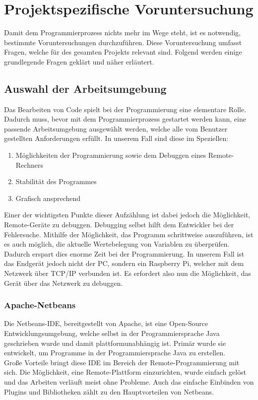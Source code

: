 \section{Projektspezifische Voruntersuchung}\label{sec:projektspezifische-voruntersuchung}
Damit dem Programmierprozess nichts mehr im Wege steht, ist es notwendig, bestimmte Voruntersuchungen durchzuführen.
Diese Voruntersuchung umfasst Fragen, welche für des gesamten Projekts relevant sind.
Folgend werden einige grundlegende Fragen geklärt und näher erläutert.
\subsection{Auswahl der Arbeitsumgebung}\label{subsec:auswahl-der-arbeitsumgebung}
Das Bearbeiten von Code spielt bei der Programmierung eine elementare Rolle.
Dadurch muss, bevor mit dem Programmierprozess gestartet werden kann, eine passende Arbeitsumgebung ausgewählt werden, welche alle vom Benutzer gestellten Anforderungen erfüllt.
In unserem Fall sind diese im Speziellen:
\begin{enumerate}
    \item Möglichkeiten der Programmierung sowie dem Debuggen eines Remote-Rechners
    \item Stabilität des Programmes
    \item Grafisch ansprechend
\end{enumerate}
Einer der wichtigsten Punkte dieser Aufzählung ist dabei jedoch die Möglichkeit, Remote-Geräte zu debuggen.
Debugging selbst hilft dem Entwickler bei der Fehlersuche.
Mithilfe der Möglichkeit, das Programm schrittweise auszuführen, ist es auch möglich, die aktuelle Wertebelegung von Variablen zu überprüfen.
Dadurch erspart dies enorme Zeit bei der Programmierung.
In unserem Fall ist das Endgerät jedoch nicht der PC, sondern ein Raspberry Pi, welcher mit dem Netzwerk über TCP/IP verbunden ist.
Es erfordert also nun die Möglichkeit, das Gerät über das Netzwerk zu debuggen.
\subsubsection{Apache-Netbeans}
Die Netbeans-IDE, bereitgestellt von Apache, ist eine Open-Source Entwicklungsumgebung, welche selbst in der Programmiersprache Java geschrieben wurde und damit plattformunabhängig ist.
Primär wurde sie entwickelt, um Programme in der Programmiersprache Java zu erstellen.\\
Große Vorteile bringt diese IDE im Bereich der Remote-Programmierung mit sich.
Die Möglichkeit, eine Remote-Plattform einzurichten, wurde einfach gelöst und das Arbeiten verläuft meist ohne Probleme.
Auch das einfache Einbinden von Plugins und Bibliotheken zählt zu den Hauptvorteilen von Netbeans.
